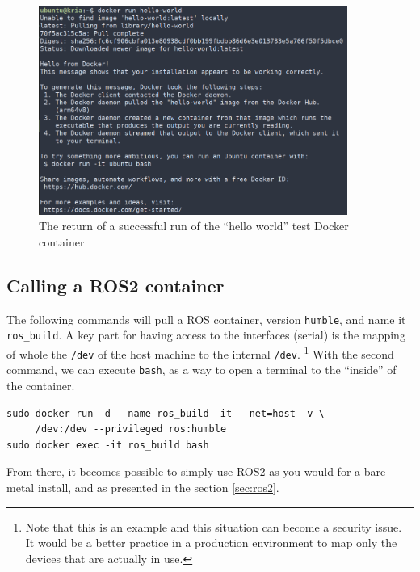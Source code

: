 \documentclass[10pt]{article}
\begin{document}
\begin{figure}[H]
  \centering
  \includegraphics[width=0.9\textwidth]{./img/hello-docker.png}
  \caption{The return of a successful run of the ``hello world'' test Docker container}
  \label{fig:hello-docker}
\end{figure}

\subsection{Calling a ROS2 container}
\label{sec:call-ros2-cont}
The following commands will pull a ROS container, version \verb|humble|, and name it \verb|ros_build|.
A key part for having access to the interfaces (serial) is the mapping of whole the \verb|/dev| of  the host machine to the
internal \verb|/dev|. \footnote{Note that this is an example and this situation can become a security issue. It would be a better practice
in a production environment to map only the devices that are actually in use.}
With the second command, we can execute \verb|bash|, as a way to open a terminal to the ``inside'' of the container.
\begin{tcolorbox}
\begin{verbatim}
sudo docker run -d --name ros_build -it --net=host -v \
     /dev:/dev --privileged ros:humble
sudo docker exec -it ros_build bash
\end{verbatim}
\end{tcolorbox}

From there, it becomes possible to simply use ROS2 as you would for a bare-metal install, and as presented in the section \ref{sec:ros2}.
\end{document}
